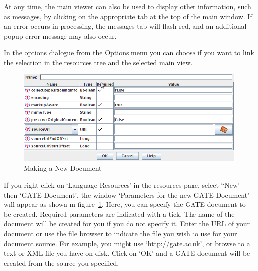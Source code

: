 At any time, the main viewer can also be used to display other
information, such as messages, by clicking on the appropriate tab at the top of 
the main window. If an error occurs in processing, the messages tab will flash 
red, and an additional popup error message may also occur.

In the options dialogue from the Options menu you can choose if you want to
link the selection in the resources tree and the selected main view.




\begin{figure}[!htb]
\begin{center}
\includegraphics[width=14cm]{making-new-document.png}
\end{center}
\caption{Making a New Document}
\label{fig:making-new-document}
\end{figure}

If you right-click on `Language Resources' in the resources pane, select ``New'
then `GATE Document', the window `Parameters for the new GATE Document' will
appear as shown in figure~\ref{fig:making-new-document}. Here, you can specify
the GATE document to be created. Required parameters are indicated with a tick.
The name of the document will be created for you if you do not specify it. Enter
the URL of your document or use the file browser to indicate the file you wish to
use for your document source. For example, you might use `http://gate.ac.uk',
or browse to a text or XML file you have on disk. Click on `OK' and a GATE
document will be created from the source you specified.


